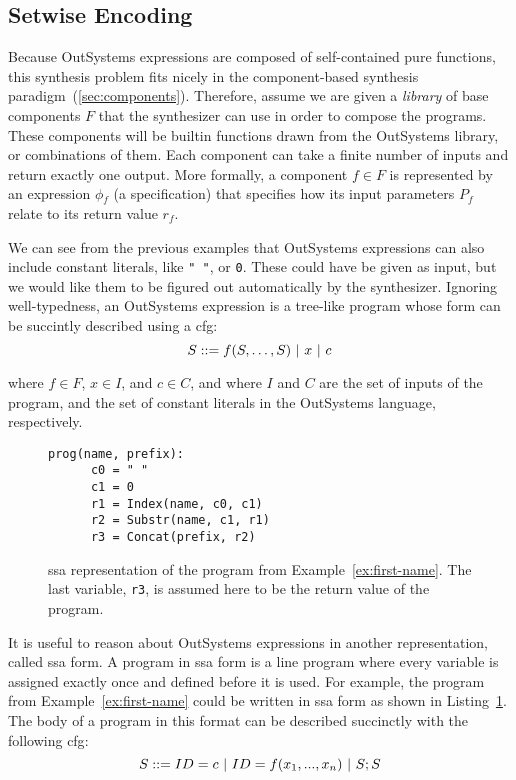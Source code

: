 \subsection{Setwise Encoding}
\label{sec:setwise-encoding}

Because OutSystems expressions are composed of self-contained pure functions,
this synthesis problem fits nicely in the component-based synthesis
paradigm~(\ref{sec:components}). Therefore, assume we are given a \textit{library}
of base components $F$ that the synthesizer can use in order to compose the
programs. These components will be builtin functions drawn from the OutSystems
library, or combinations of them. Each component can take a finite number of
inputs and return exactly one output. More formally, a component $f \in F$ is
represented by an expression $\phi{}_f$ (a specification) that specifies how its
input parameters $P_f$ relate to its return value $r_f$.

We can see from the previous examples that OutSystems expressions can also
include constant literals, like \lstinline{" "}, or \lstinline{0}. These could
have be given as input, but we would like them to be figured out automatically
by the synthesizer. Ignoring well-typedness, an OutSystems expression is a
tree-like program whose form can be succintly described using a \gls{cfg}:
%
\[S ::= f(S, \ldots, S) \ |\  x \ |\  c\]

\noindent
where $f \in F$, $x \in I$, and $c \in C$, and where $I$ and $C$ are the set of
inputs of the program, and the set of constant literals in the OutSystems
language, respectively.

\begin{figure}
  \begin{lstlisting}[frame=tlrb]
    prog(name, prefix):
      c0 = " "
      c1 = 0
      r1 = Index(name, c0, c1)
      r2 = Substr(name, c1, r1)
      r3 = Concat(prefix, r2)
  \end{lstlisting}
\caption{\gls{ssa} representation of the program from
    Example~\ref{ex:first-name}. The last variable, \lstinline{r3}, is assumed
    here to be the return value of the program.}
\label{fig:first-name-ssa}
\end{figure}

It is useful to reason about OutSystems expressions in another representation,
called \gls{ssa} form. A program in \gls{ssa} form is a line program where every
variable is assigned exactly once and defined before it is used. For example,
the program from Example~\ref{ex:first-name} could be written in \gls{ssa} form
as shown in Listing~\ref{fig:first-name-ssa}. The body of a program in this
format can be described succinctly with the following \gls{cfg}:
%
\[S ::= ID = c \ |\  ID = f(x_1, ..., x_n) \ |\  S;S\]

